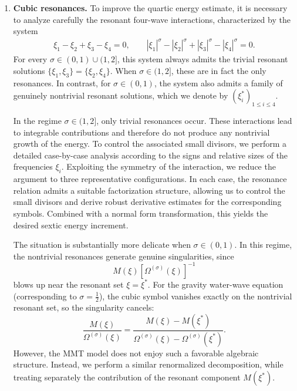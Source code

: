 \documentclass[UTF-8,reqno]{amsart}
\numberwithin{equation}{section}
\theoremstyle{definition}
\def\le{\leqslant}
\def\le{\leqslant}
\begin{document}
\begin{enumerate}
Moreover, expressing the symbol in this form allows us to obtain robust derivative bounds needed for the application of Lemma~\ref{lem:sinfty}. 
A crucial observation is that for any multi-index $\alpha$, any $a,b>0$, and any $\gamma\in\mathbb R$,
\begin{align*}
    |\xi^\alpha\partial_\xi^\alpha[(a\xi_1+b\xi_2)^\gamma]|
    \lesssim
    (a\xi_1+b\xi_2)^\gamma.
\end{align*}
This property guarantees that the differentiated symbols preserve the same scaling behavior as the original phase factors. Subsequently, we rewrite all relevant expressions in terms of combinations of homogeneous power-law factors, which allows us to recover the appropriate scaling properties and establish uniform symbol estimates.
 
 \item \textbf{Cubic resonances.} 
To improve the quartic energy estimate, it is necessary to analyze carefully the resonant four-wave interactions, characterized by the system
\begin{align*}
    \xi_1 - \xi_2 + \xi_3 - \xi_4 = 0,
    \qquad
    |\xi_1|^{\sigma} - |\xi_2|^{\sigma}
    + |\xi_3|^{\sigma} - |\xi_4|^{\sigma} = 0.
\end{align*}
For every $\sigma\in(0,1)\cup(1,2]$, this system always admits the trivial resonant solutions $\{\xi_1,\xi_3\}=\{\xi_2,\xi_4\}.$
When $\sigma\in(1,2]$, these are in fact the only resonances. 
In contrast, for $\sigma\in(0,1)$, the system also admits a family of genuinely nontrivial resonant solutions, which we denote by $(\xi_i^*)_{1\le i\le4}$.

In the regime $\sigma\in(1,2]$, only trivial resonances occur. 
These interactions lead to integrable contributions and therefore do not produce any nontrivial growth of the energy. 
To control the associated small divisors, we perform a detailed case-by-case analysis according to the signs and relative sizes of the frequencies $\xi_i$. 
Exploiting the symmetry of the interaction, we reduce the argument to three representative configurations. 
In each case, the resonance relation admits a suitable factorization structure, allowing us to control the small divisors and derive robust derivative estimates for the corresponding symbols. 
Combined with a normal form transformation, this yields the desired sextic energy increment.

The situation is substantially more delicate when $\sigma\in(0,1)$. 
In this regime, the nontrivial resonances generate genuine singularities, since
\[
M(\xi)[\Omega^{(\sigma)}(\xi)]^{-1}
\]
blows up near the resonant set $\xi=\xi^*$. 
For the gravity water-wave equation \cite{DIP25a} (corresponding to $\sigma=\frac12$), the cubic symbol vanishes exactly on the nontrivial resonant set, so the singularity cancels:
\[
\frac{M(\xi)}{\Omega^{(\sigma)}(\xi)}
=
\frac{M(\xi)-M(\xi^*)}
{\Omega^{(\sigma)}(\xi)-\Omega^{(\sigma)}(\xi^*)}.
\]
However, the MMT model does not enjoy such a favorable algebraic structure. 
Instead, we perform a similar renormalized decomposition, while treating separately the contribution of the resonant component $M(\xi^*)$. 


\end{enumerate}
\end{document}
